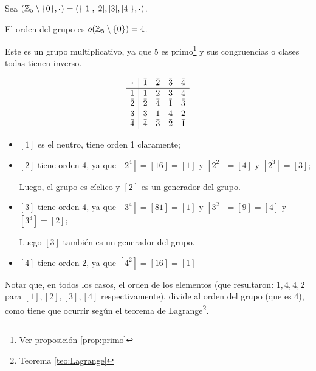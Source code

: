 \begin{fmd-example} 
	
	Sea $\left( \mathbb{Z}_5 \setminus \{0\}, \boldsymbol{\cdot} \right) = \left( \{ [1], [2], [3], [4] \}, \boldsymbol{\cdot} \right)$.
	
	El orden del grupo es $o(\mathbb{Z}_5 \setminus \{0\}) = 4$.
	
	Este es un grupo multiplicativo, ya que 5 es primo\footnote{Ver proposición \ref{prop:primo}} y sus congruencias o clases todas tienen inverso.
	
	\begin{table}[H]
		\centering
		\[
		\begin{array}{c|cccc}
			\boldsymbol{\cdot} & \bar{1} & \bar{2} & \bar{3} & \bar{4}\\ \hline
			\bar{1} & \bar{1} & \bar{2} & \bar{3} & \bar{4}\\
			\bar{2} & \bar{2} & \bar{4} & \bar{1} & \bar{3}\\
			\bar{3} & \bar{3} & \bar{1} & \bar{4} & \bar{2}\\
			\bar{4} & \bar{4} & \bar{3} & \bar{2} & \bar{1}\\
		\end{array}
		\]
	\end{table}
	\begin{itemize}
		\item $[1]$ es el neutro, tiene orden 1 claramente;
		\item $[2]$ tiene orden 4, ya que $[2^4] = [16] = [1]$ y $[2^2] = [4]$ y $[2^3] = [3]$;
		
		Luego, el grupo es cíclico y $[2]$ es un generador del grupo.
		
		\item $[3]$ tiene orden 4, ya que $[3^4] = [81] = [1]$ y $[3^2] = [9] = [4]$ y $[3^3] = [2]$;
		
		Luego $[3]$ también es un generador del grupo.
		\item $[4]$ tiene orden 2, ya que $[4^2] = [16] = [1]$
	\end{itemize}
	Notar que, en todos los casos, el orden de los elementos (que resultaron: $1, 4, 4, 2$ para $[1], [2], [3], [4]$ respectivamente), divide al orden del grupo (que es 4), como tiene que ocurrir según el teorema de Lagrange\footnote{Teorema \ref{teo:Lagrange}}.
\end{fmd-example}

